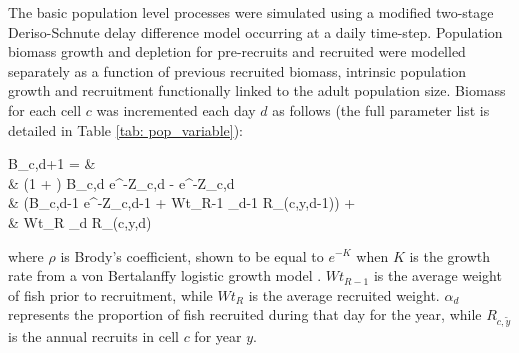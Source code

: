 \documentclass[review]{elsarticle}
\let\oldequation\equation
\let\oldendequation\endequation
\renewenvironment{equation}
 {\linenomathNonumbers\oldequation}
 {\oldendequation\endlinenomath}
\begin{document}
The basic population level processes were simulated using a modified two-stage
Deriso-Schnute delay difference model \citep{Deriso1980, Schnute1985,
	Dichmont2003} occurring at a daily time-step. 
Population
biomass growth and depletion for pre-recruits and
recruited  were modelled
separately as a function of previous recruited biomass, intrinsic population
growth and recruitment functionally linked to the adult population size.
Biomass for each cell $c$ was incremented each day $d$ as follows (the full
parameter list is detailed in Table \ref{tab: pop_variable}): 
\begin{equation}
	\begin{split}
	B_{c,d+1} = &\\
	& (1 + \rho) B_{c,d} \cdot e^{-Z_{c,d}} - \rho \cdot e^{-Z_{c,d}} \hspace{2.9cm}
	\times \\  
	& (B_{c,d-1} \cdot e^{-Z_{c,d-1}} + Wt_{R-1} \cdot \alpha_{d-1} \cdot
	R_{(c,y,d-1)})
	\hspace{0.4cm} + \\
	& Wt_{R} \cdot \alpha_{d} \cdot R_{(c,y,d)} 
	\end{split}
\end{equation}
where $\rho$ is Brody's coefficient, shown to be equal to $e^{-K}$ when $K$ is
the growth rate from a von Bertalanffy logistic growth model
\citep{Schnute1985}. $Wt_{R-1}$ is the average weight of fish prior to
recruitment, while $Wt_{R}$ is the average recruited weight. $\alpha_{d}$
represents the proportion of fish recruited during that day for the year, while
$R_{c,\tilde{y}}$ is the annual recruits in cell $c$ for year $y$. \\
\end{document}
